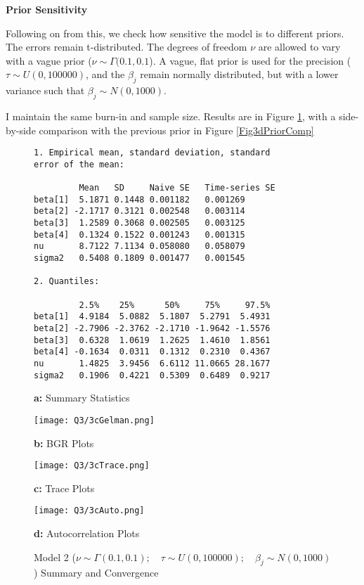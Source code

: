 \documentclass{article}
\begin{document}
\textbf{Prior Sensitivity}

Following on from this, we check how sensitive the model is to different priors. The errors remain t-distributed. The degrees of freedom $\nu$ are allowed to vary with a vague prior ($\nu \sim \Gamma(0.1, 0.1$). A vague, flat prior is used for the precision ($\tau \sim U(0, 100000)$, and the $\beta_j$ remain normally distributed, but with a lower variance such that $\beta_j \sim N(0, 1000)$. 

I maintain the same burn-in and sample size. Results are in Figure \ref{Fig3dPriorSens}, with a side-by-side comparison with the previous prior in Figure \ref{Fig3dPriorComp}

\begin{figure}[!h]
    \begin{minipage}[l]{0.5\textwidth}
        \begin{Verbatim}[frame = single]
1. Empirical mean, standard deviation, standard 
error of the mean:

         Mean   SD     Naive SE   Time-series SE
beta[1]  5.1871 0.1448 0.001182   0.001269
beta[2] -2.1717 0.3121 0.002548   0.003114
beta[3]  1.2589 0.3068 0.002505   0.003125
beta[4]  0.1324 0.1522 0.001243   0.001315
nu       8.7122 7.1134 0.058080   0.058079
sigma2   0.5408 0.1809 0.001477   0.001545

2. Quantiles:

         2.5%    25%      50%     75%     97.5%
beta[1]  4.9184  5.0882  5.1807  5.2791  5.4931
beta[2] -2.7906 -2.3762 -2.1710 -1.9642 -1.5576
beta[3]  0.6328  1.0619  1.2625  1.4610  1.8561
beta[4] -0.1634  0.0311  0.1312  0.2310  0.4367
nu       1.4825  3.9456  6.6112 11.0665 28.1677
sigma2   0.1906  0.4221  0.5309  0.6489  0.9217
        \end{Verbatim} 
        \centerline{\textbf{a:} Summary Statistics}
    \end{minipage}
    \begin{minipage}[pos=r]{0.5\textwidth}
        \texttt{[image: Q3/3cGelman.png]} \vspace{-2mm}
        \centerline{\textbf{b:} BGR Plots}
    \end{minipage}
    
    
    \begin{minipage}[pos=l]{0.5\textwidth}
        \texttt{[image: Q3/3cTrace.png]}
        \centerline{\textbf{c:} Trace Plots}
    \end{minipage}
    \begin{minipage}[pos=r]{0.5\textwidth}
        \texttt{[image: Q3/3cAuto.png]}
        \centerline{\textbf{d:} Autocorrelation Plots}
    \end{minipage} \vspace{-2mm}
\caption{Model 2 ($\nu \sim \Gamma(0.1, 0.1);\quad \tau \sim U(0, 100000); \quad \beta_j \sim N(0, 1000)$) Summary and Convergence} \label{Fig3dPriorSens}
\end{figure}
\end{document}
